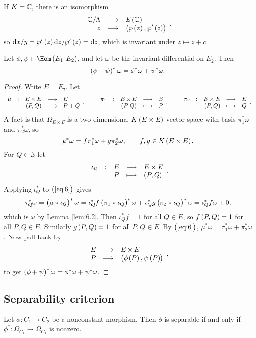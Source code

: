 \begin{remark*}
If $ K = \mathbb{C} $, there is an isomorphism
$$ \function{\CC / \Lambda}{E\br{\CC}}{z}{\br{\wp\br{z}, \wp'\br{z}}}, $$
so $ \d x / y = \wp'\br{z}\d z / \wp'\br{z} = \d z $, which is invariant under $ z \mapsto z + c $.
\end{remark*}

\begin{lemma}
\label{lem:6.3}
Let $ \phi, \psi \in \Hom\br{E_1, E_2} $, and let $ \omega $ be the invariant differential on $ E_2 $. Then
$$ \br{\phi + \psi}^*\omega = \phi^*\omega + \psi^*\omega. $$
\end{lemma}

\begin{proof}
Write $ E = E_2 $. Let
$$ \function[\mu]{E \times E}{E}{\br{P, Q}}{P + Q}, \qquad \function[\pi_1]{E \times E}{E}{\br{P, Q}}{P}, \qquad \function[\pi_2]{E \times E}{E}{\br{P, Q}}{Q}. $$
A fact is that $ \Omega_{E \times E} $ is a two-dimensional $ K\br{E \times E} $-vector space with basis $ \pi_1^*\omega $ and $ \pi_2^*\omega $, so
\begin{equation}
\label{eq:6}
\mu^*\omega = f\pi_1^*\omega + g\pi_2^*\omega, \qquad f, g \in K\br{E \times E}.
\end{equation}
For $ Q \in E $ let
$$ \function[\iota_Q]{E}{E \times E}{P}{\br{P, Q}}. $$
Applying $ \iota_Q^* $ to $ \br{\ref{eq:6}} $ gives
$$ \tau_Q^*\omega = \br{\mu \circ \iota_Q}^*\omega = \iota_Q^*f\br{\pi_1 \circ \iota_Q}^*\omega + \iota_Q^*g\br{\pi_2 \circ \iota_Q}^*\omega = \iota_Q^*f\omega + 0, $$
which is $ \omega $ by Lemma \ref{lem:6.2}. Then $ \iota_Q^*f = 1 $ for all $ Q \in E $, so $ f\br{P, Q} = 1 $ for all $ P, Q \in E $. Similarly $ g\br{P, Q} = 1 $ for all $ P, Q \in E $. By $ \br{\ref{eq:6}} $, $ \mu^*\omega = \pi_1^*\omega + \pi_2^*\omega $. Now pull back by
$$ \function{E}{E \times E}{P}{\br{\phi\br{P}, \psi\br{P}}}, $$
to get $ \br{\phi + \psi}^*\omega = \phi^*\omega + \psi^*\omega $.
\end{proof}

\pagebreak

\subsection{Separability criterion}

\begin{lemma}
Let $ \phi : C_1 \to C_2 $ be a nonconstant morphism. Then $ \phi $ is separable if and only if $ \phi^* : \Omega_{C_1} \to \Omega_{C_1} $ is nonzero.
\end{lemma}

